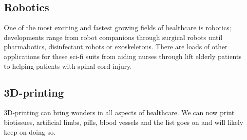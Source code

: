 \documentclass{article}
\begin{document}
\subsection{Robotics}
One of the most exciting and fastest growing fields of healthcare is robotics; developments range from robot companions through surgical robots until pharmabotics, disinfectant robots or exoskeletons. There are loads of other applications for these sci-fi suits from aiding nurses through lift elderly patients to helping patients with spinal cord injury.
 \subsection{3D-printing}
 3D-printing can bring wonders in all aspects of healthcare. We can now print biotissues, artificial limbs, pills, blood vessels and the list goes on and will likely keep on doing so.
\end{document}
